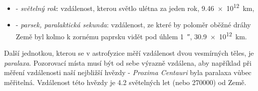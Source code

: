 {\begin{itemize}
\begin{itemize}
          \item Vzdálenost Slunce od středu Galaxie je přibližně \SI{1.7e9}{\AU}.
          \item Velikost viditelného vesmíru je asi \SI{8.66e14}{\AU}.
        \end{itemize}
      \item \textbf{\si{\lightyear}} - \emph{světelný rok}: vzdálenost, kterou světlo ulétna za    
            jeden rok, \SI{9.46e12}{\km},
      \item \textbf{\si{\parsec}} - \emph{parsek, paralaktická sekunda}: vzdálenost, ze které by  
            poloměr oběžné dráhy Země byl kolmo k zornému paprsku vidět pod úhlem 
            \SI{1}{\arcsecond}, 
            \SI{30.9e12}{\km}. 
    \end{itemize}
    
    
    Další jednotkou, kterou se v astrofyzice měří vzdálenost dvou vesmírných těles, je 
    \emph{paralaxa}. Pozorovací místa musí být od sebe výrazně vzdálena, aby například při měření 
    vzdálenosti naší nejbližší hvězdy - \emph{Proxima Centauri} byla paralaxa vůbec měřitelná. 
    Vzdálenost této hvězdy je \num{4.2} světelných let (nebo \SI{270000}{\AU}) od Země.
     
    

} %
\printbibliography[title={Seznam literatury},heading=subbibliography]
